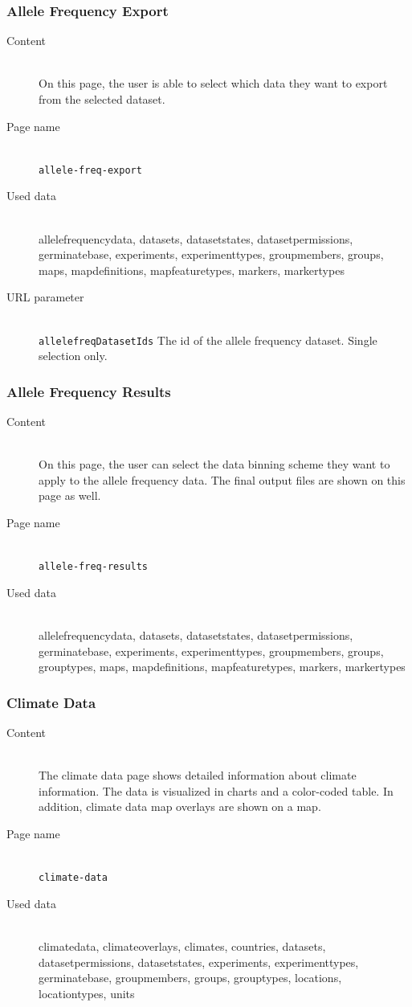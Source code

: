 \subsubsection{Allele Frequency Export}
\begin{description}
	\item[Content]\hfill\\On this page, the user is able to select which data they want to export from the selected dataset.
	\item[Page name]\hfill\\\texttt{allele-freq-export}
	\item[Used data]\hfill\\allelefrequencydata, datasets, datasetstates, datasetpermissions, germinatebase, experiments, experimenttypes, groupmembers, groups, maps, mapdefinitions, mapfeaturetypes, markers, markertypes
	\item[URL parameter]\hfill\\\texttt{allelefreqDatasetIds} The id of the allele frequency dataset. Single selection only.
\end{description}

\subsubsection{Allele Frequency Results}
\begin{description}
	\item[Content]\hfill\\On this page, the user can select the data binning scheme they want to apply to the allele frequency data. The final output files are shown on this page as well.
	\item[Page name]\hfill\\\texttt{allele-freq-results}
	\item[Used data]\hfill\\allelefrequencydata, datasets, datasetstates, datasetpermissions, germinatebase, experiments, experimenttypes, groupmembers, groups, grouptypes, maps, mapdefinitions, mapfeaturetypes, markers, markertypes
\end{description}

\subsubsection{Climate Data}
\begin{description}
	\item[Content]\hfill\\The climate data page shows detailed information about climate information. The data is visualized in charts and a color-coded table. In addition, climate data map overlays are shown on a map.
	\item[Page name]\hfill\\\texttt{climate-data}
	\item[Used data]\hfill\\climatedata, climateoverlays, climates, countries, datasets, datasetpermissions, datasetstates, experiments, experimenttypes, germinatebase, groupmembers, groups, grouptypes, locations, locationtypes, units
\end{description}

